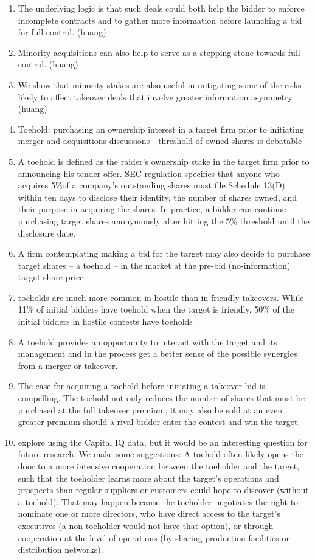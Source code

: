 \documentclass[12pt]{article}
\begin{document}
\begin{enumerate}
		\item The underlying logic is that such deals could both help the bidder to enforce incomplete contracts and to gather more information before launching a bid for full control. (huang)
		\item Minority acquisitions can also help to serve as a stepping-stone towards full control. (huang)
		
        \item We show that minority stakes are also useful in mitigating some of the risks likely to affect takeover deals that involve greater information asymmetry (huang)

		\item Toehold: purchasing an ownership interest in a target firm prior to initiating merger-and-acquisitions discussions - threshold of owned shares is debatable 
		\item A toehold is defined as the raider’s ownership stake in the target firm prior to announcing his tender offer. SEC regulation specifies that anyone who acquires 5\%of a company’s outstanding shares must file Schedule 13(D) within ten days to disclose their identity, the number of shares owned, and their purpose in acquiring the shares. In practice, a bidder can continue purchasing target shares anonymously after hitting the 5\% threshold until the disclosure date. \citep{Goldman2005}
		\item A firm contemplating making a bid for the target may also decide to purchase target shares -- a toehold -- in the market at the pre-bid (no-information) target share price. \citep{Mitchell2011}
		\item toeholds are much more common in hostile than in friendly takeovers. While 11\% of initial bidders have toehold when the target is friendly, 50\% of the initial bidders in hostile contests have toeholds \citep{Mitchell2011}
		\item A toehold provides an opportunity to interact with the target and its management and in the process get a better sense of the possible synergies from a merger or takeover. \citep{Povel2014}
		\item The case for acquiring a toehold before initiating a takeover bid is compelling. The toehold not only reduces the number of shares that must be purchased at the full takeover premium, it may also be sold at an even greater premium should a rival bidder enter the contest and win the target. \citep{Eckbo2009}
		\item explore using the Capital IQ data, but it would be an interesting question for future research. We make some suggestions: A toehold often likely opens the door to a more intensive cooperation between the toeholder and the target, such that the toeholder learns more about the target's operations and prospects than regular suppliers or customers could hope to discover (without a toehold). That may happen because the toeholder negotiates the right to nominate one or more directors, who have direct access to the target's executives (a non-toeholder would not have that option), or through cooperation at the level of operations (by sharing production facilities or distribution networks). \citep{Povel2014}

\end{enumerate}
\end{document}
